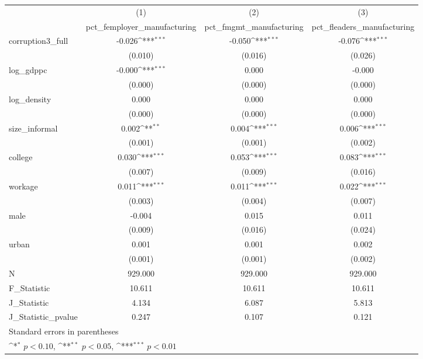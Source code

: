 {
\def\sym#1{\ifmmode^{#1}\else\(^{#1}\)\fi}
\begin{tabular}{l*{3}{c}}
\hline\hline
            &\multicolumn{1}{c}{(1)}&\multicolumn{1}{c}{(2)}&\multicolumn{1}{c}{(3)}\\
            &\multicolumn{1}{c}{pct\_femployer\_manufacturing}&\multicolumn{1}{c}{pct\_fmgmt\_manufacturing}&\multicolumn{1}{c}{pct\_fleaders\_manufacturing}\\
\hline
corruption3\_full&      -0.026\sym{***}&      -0.050\sym{***}&      -0.076\sym{***}\\
            &     (0.010)         &     (0.016)         &     (0.026)         \\
[1em]
log\_gdppc   &      -0.000\sym{***}&       0.000         &      -0.000         \\
            &     (0.000)         &     (0.000)         &     (0.000)         \\
[1em]
log\_density &       0.000         &       0.000         &       0.000         \\
            &     (0.000)         &     (0.000)         &     (0.000)         \\
[1em]
size\_informal&       0.002\sym{**} &       0.004\sym{***}&       0.006\sym{***}\\
            &     (0.001)         &     (0.001)         &     (0.002)         \\
[1em]
college     &       0.030\sym{***}&       0.053\sym{***}&       0.083\sym{***}\\
            &     (0.007)         &     (0.009)         &     (0.016)         \\
[1em]
workage     &       0.011\sym{***}&       0.011\sym{***}&       0.022\sym{***}\\
            &     (0.003)         &     (0.004)         &     (0.007)         \\
[1em]
male        &      -0.004         &       0.015         &       0.011         \\
            &     (0.009)         &     (0.016)         &     (0.024)         \\
[1em]
urban       &       0.001         &       0.001         &       0.002         \\
            &     (0.001)         &     (0.001)         &     (0.002)         \\
\hline
N           &     929.000         &     929.000         &     929.000         \\
F\_Statistic &      10.611         &      10.611         &      10.611         \\
J\_Statistic &       4.134         &       6.087         &       5.813         \\
J\_Statistic\_pvalue&       0.247         &       0.107         &       0.121         \\
\hline\hline
\multicolumn{4}{l}{\footnotesize Standard errors in parentheses}\\
\multicolumn{4}{l}{\footnotesize \sym{*} \(p<0.10\), \sym{**} \(p<0.05\), \sym{***} \(p<0.01\)}\\
\end{tabular}
}
